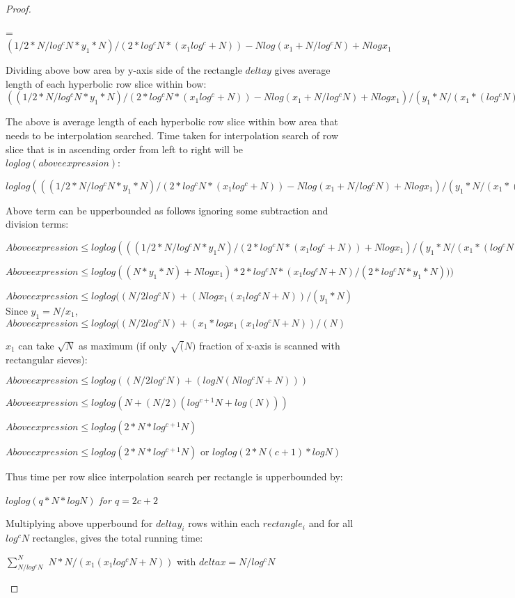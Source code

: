 \documentclass[11pt,onecolumn]{article}
\begin{document}
\begin{proof}
\begin{enumerate}
=$(1/2*N/log^{c}N * y_{1}*N)/(2*log^{c}N*(x_{1}log^{c}+N)) - N log(x_{1} + N/log^{c}N) + Nlogx_{1}$

Dividing above bow area by y-axis side of the rectangle $deltay$ gives average length of each hyperbolic row slice within bow: 
$((1/2*N/log^{c}N * y_{1}*N)/(2*log^{c}N*(x_{1}log^{c}+N)) - N log(x_{1} + N/log^{c}N) + Nlogx_{1})/(y_{1}*N/(x_{1}* (log^{c}N) + N))$

The above is average length of each hyperbolic row slice within bow area that needs to be interpolation searched. Time taken for interpolation search of row slice that is in ascending order from left to right will be $loglog(above expression)$:

$loglog(((1/2*N/log^{c}N * y_{1} * N)/(2*log^{c}N*(x_{1}log^{c}+N)) - N log(x_{1} + N/log^{c}N) + Nlogx_{1})/(y_{1}*N/(x_{1}* (log^{c}N) + N))
)$ 

Above term can be upperbounded as follows ignoring some subtraction and division terms:

$Above expression \le loglog(((1/2*N/log^{c}N * y_{1} N)/(2*log^{c}N*(x_{1}log^{c}+N)) + Nlogx_{1})/(y_{1}*N/(x_{1}* (log^{c}N) + N))
)$

$Above expression \le loglog((N * y_{1} * N) + Nlogx_{1})*2*log^{c}N*(x_{1}log^{c}N+N)/(2*log^{c}N*y_{1}*N))
)$

$Above expression \le loglog((N/2log^{c}N) + (Nlogx_{1}(x_{1}log^{c}N+N))/(y_{1}*N)$
Since $y_{1}=N/x_{1}$,
$Above expression \le loglog((N/2log^{c}N) + (x_{1}*logx_{1}(x_{1}log^{c}N+N))/(N)$

$x_{1}$ can take $\sqrt{N}$ as maximum (if only $\sqrt(N)$ fraction of x-axis is scanned with rectangular sieves):

$Above expression \le loglog((N/2log^{c}N) + (logN(Nlog^{c}N+N)))$

$Above expression \le loglog(N + (N/2)(log^{c+1}N+log(N)))$

$Above expression \le loglog(2*N*log^{c+1}N)$

$Above expression \le loglog(2*N*log^{c+1}N)$ or $loglog(2*N(c+1)*logN)$

Thus time per row slice interpolation search per rectangle is upperbounded by:

\emph{$loglog(q*N*logN)$ for $q=2c+2$}

Multiplying above upperbound for $deltay_{i}$ rows within each $rectangle_{i}$ and for all $log^{c}N$ rectangles, gives the total running time:

$\sum_{N/log^{c}N}^{N}$ $N*N/(x_{1}(x_{1}log^{c}N+N))$ with $deltax = N/log^{c}N$


\end{enumerate}
\end{proof}
\end{document}

